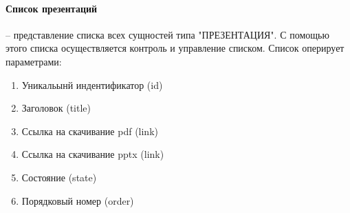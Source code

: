 \paragraph{Список презентаций} -- представление списка всех сущностей типа "ПРЕЗЕНТАЦИЯ". С помощью этого списка осуществляется контроль и управление списком.
Список оперирует параметрами:
\begin{enumerate}
  \item Уникальынй индентификатор (id)
  \item Заголовок (title)
  \item Ссылка на скачивание pdf (link)
  \item Ссылка на скачивание pptx (link)
  \item Состояние (state)
  \item Порядковый номер (order)
\end{enumerate}
